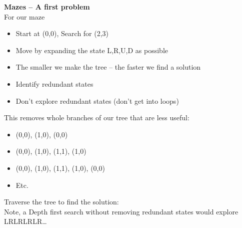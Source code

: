 \documentclass{article}%
\begin{document}
\textbf{Mazes – A first problem} \\
For our maze \\
\begin{itemize}
    \item Start at (0,0), Search for (2,3)
    \item Move by expanding the state L,R,U,D as possible
    \item The smaller we make the tree – the faster we find a solution
    \item Identify redundant states
    \item Don't explore redundant states (don't get into loops)
\end{itemize}
This removes whole branches of our tree that are less useful: \\
\begin{itemize}
    \item (0,0), (1,0), (0,0)
    \item (0,0), (1,0), (1,1), (1,0)
    \item (0,0), (1,0), (1,1), (1,0), (0,0)
    \item Etc.
\end{itemize}
Traverse the tree to find the solution: \\
Note, a Depth first search without removing redundant states would explore \\
LRLRLRLR…
%
\end{document}
